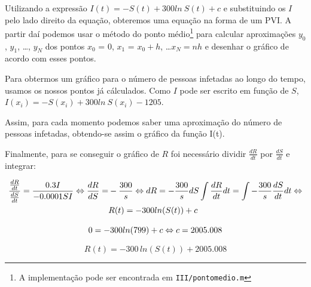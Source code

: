 \documentclass[portuguese, a4paper]{article}
\newcommand\tu[0]{\textunderscore}
\begin{document}
		\subsubsection{} \label{sec:III.2c)}
		\par
		Utilizando a expressão $I(t) = -S(t) + 300ln~S(t) + c$ e substituindo
		os $I$ pelo lado direito da equação, obteremos uma equação na forma de
		um PVI\@. A partir daí podemos usar o método do ponto médio\footnote{A
		implementação pode ser encontrada em \texttt{III/ponto\tu medio.m}}
		para calcular aproximações $y_0$, $y_1$, \ldots, $y_N$ dos pontos $x_0$
		= 0, $x_1$ = $x_0 + h$, \ldots $x_N= nh$ e desenhar o gráfico de acordo
		com esses pontos.

		\par
		Para obtermos um gráfico para o número de pessoas infetadas ao longo do
		tempo, usamos os nossos pontos já cálculados. Como $I$ pode ser escrito
		em função de $S$, $I(x_i) = -S(x_i) + 300ln~S(x_i) - 1205$.

		\par
		Assim, para cada momento podemos saber uma aproximação do número de
		pessoas infetadas, obtendo-se assim	o gráfico da função I(t).

		\par \null \par
		Finalmente, para se conseguir o gráfico de $R$ foi necessário
		dividir $\frac{dR}{dt}$ por $\frac{dS}{dt}$ e integrar:

		\begin{equation}
		\begin{split}
			\frac{\frac{dR}{dt}}{\frac{dS}{dt}} = \frac{0.3 I}{-0.0001 S I}
			\Leftrightarrow
			\frac{dR}{dS} = &-\frac{300}{s} \Leftrightarrow dR =
			-\frac{300}{s} dS
			\int \frac{dR}{dt}dt = \int -\frac{300}{s} \frac{dS}{dt}dt
			\Leftrightarrow \\ \newline
			& R(t) = -300 ln(S(t)) + c
		\end{split}
		\end{equation}

		\begin{equation}
			0 = -300 ln(799) + c \Leftrightarrow \\
			c = 2005.008 \\
		\end{equation}

		\begin{equation}
			R(t) = -300\, ln(S(t)) + 2005.008
		\end{equation}
\end{document}
